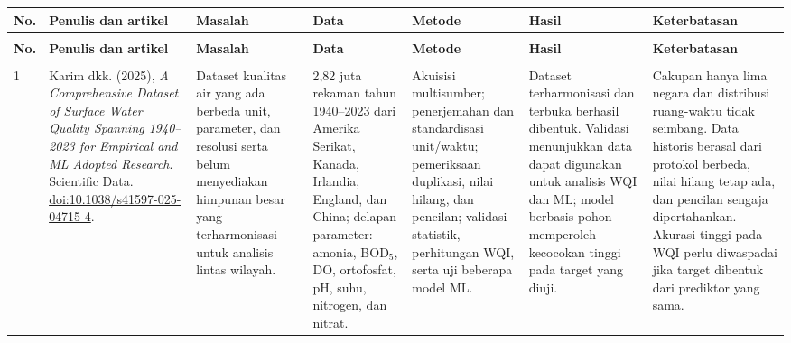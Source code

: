 \documentclass[10pt,a4paper]{article}
\begin{document}
\vspace{6pt}
\scriptsize
\begin{longtable}{|>{\centering\arraybackslash}p{0.55cm}|P{3.65cm}|P{3.55cm}|P{3.55cm}|P{4.10cm}|P{4.10cm}|P{4.10cm}|}
\hline
{}
\textbf{No.} & \textbf{Penulis dan artikel} & \textbf{Masalah} & \textbf{Data} & \textbf{Metode} & \textbf{Hasil} & \textbf{Keterbatasan} \\
\hline
\endfirsthead

\\[2pt]
\hline
{}
\textbf{No.} & \textbf{Penulis dan artikel} & \textbf{Masalah} & \textbf{Data} & \textbf{Metode} & \textbf{Hasil} & \textbf{Keterbatasan} \\
\hline
\endhead

\hline
{}\\
\endfoot

\hline
\endlastfoot

1 & Karim dkk. (2025), \textit{A Comprehensive Dataset of Surface Water Quality Spanning 1940--2023 for Empirical and ML Adopted Research}. Scientific Data. \href{https://doi.org/10.1038/s41597-025-04715-4}{doi:10.1038/s41597-025-04715-4}. & Dataset kualitas air yang ada berbeda unit, parameter, dan resolusi serta belum menyediakan himpunan besar yang terharmonisasi untuk analisis lintas wilayah. & 2,82 juta rekaman tahun 1940--2023 dari Amerika Serikat, Kanada, Irlandia, England, dan China; delapan parameter: amonia, BOD$_5$, DO, ortofosfat, pH, suhu, nitrogen, dan nitrat. & Akuisisi multisumber; penerjemahan dan standardisasi unit/waktu; pemeriksaan duplikasi, nilai hilang, dan pencilan; validasi statistik, perhitungan WQI, serta uji beberapa model ML. & Dataset terharmonisasi dan terbuka berhasil dibentuk. Validasi menunjukkan data dapat digunakan untuk analisis WQI dan ML; model berbasis pohon memperoleh kecocokan tinggi pada target yang diuji. & Cakupan hanya lima negara dan distribusi ruang-waktu tidak seimbang. Data historis berasal dari protokol berbeda, nilai hilang tetap ada, dan pencilan sengaja dipertahankan. Akurasi tinggi pada WQI perlu diwaspadai jika target dibentuk dari prediktor yang sama. \\
\hline


\end{longtable}
\end{document}
